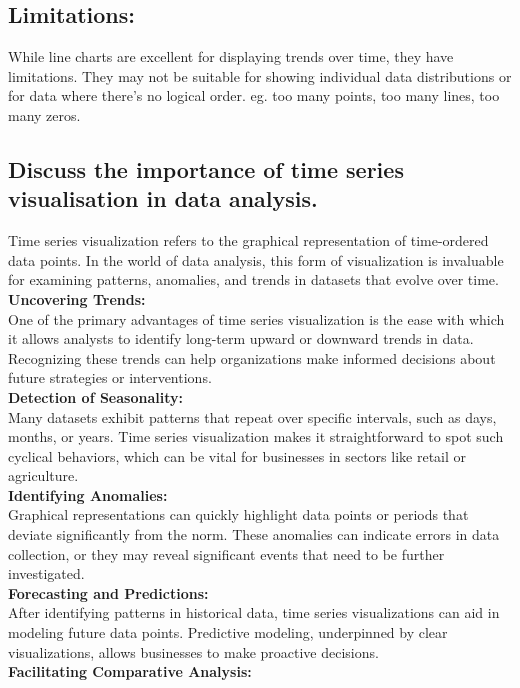 \documentclass{article}\usepackage[]{graphicx}\usepackage[]{xcolor}
\begin{document}
\subsection{Limitations:}
While line charts are excellent for displaying trends over time, they have limitations. They may not be suitable for showing individual data distributions or for data where there's no logical order. eg. too many points, too many lines, too many zeros.\\


\subsection*{Discuss the importance of time series visualisation in data analysis.}

Time series visualization refers to the graphical representation of time-ordered data points. In the world of data analysis, this form of visualization is invaluable for examining patterns, anomalies, and trends in datasets that evolve over time.\\
\textbf{Uncovering Trends:}\\
One of the primary advantages of time series visualization is the ease with which it allows analysts to identify long-term upward or downward trends in data. Recognizing these trends can help organizations make informed decisions about future strategies or interventions.\\
\textbf{Detection of Seasonality:}\\
Many datasets exhibit patterns that repeat over specific intervals, such as days, months, or years. Time series visualization makes it straightforward to spot such cyclical behaviors, which can be vital for businesses in sectors like retail or agriculture.\\
\textbf{Identifying Anomalies:}\\
Graphical representations can quickly highlight data points or periods that deviate significantly from the norm. These anomalies can indicate errors in data collection, or they may reveal significant events that need to be further investigated.\\
\textbf{Forecasting and Predictions:}\\
After identifying patterns in historical data, time series visualizations can aid in modeling future data points. Predictive modeling, underpinned by clear visualizations, allows businesses to make proactive decisions.\\
\textbf{Facilitating Comparative Analysis:}\\
\end{document}
